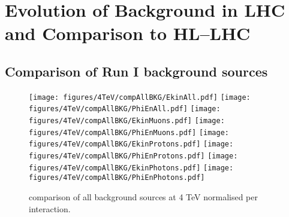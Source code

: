 \section{Evolution of Background in LHC and Comparison to HL--LHC\label{evolut}}
\subsection{Comparison of Run I background sources}
\begin{figure}
\begin{center}
  \texttt{[image: figures/4TeV/compAllBKG/EkinAll.pdf]}
  \texttt{[image: figures/4TeV/compAllBKG/PhiEnAll.pdf]}
  \texttt{[image: figures/4TeV/compAllBKG/EkinMuons.pdf]}
  \texttt{[image: figures/4TeV/compAllBKG/PhiEnMuons.pdf]}
  \texttt{[image: figures/4TeV/compAllBKG/EkinProtons.pdf]}
  \texttt{[image: figures/4TeV/compAllBKG/PhiEnProtons.pdf]}
  \texttt{[image: figures/4TeV/compAllBKG/EkinPhotons.pdf]}
  \texttt{[image: figures/4TeV/compAllBKG/PhiEnPhotons.pdf]}
\end{center}
\vspace{-0.6cm}
 \caption{comparison of all background sources at 4 TeV normalised per interaction.
  \label{compPM_raden}}
\end{figure}



